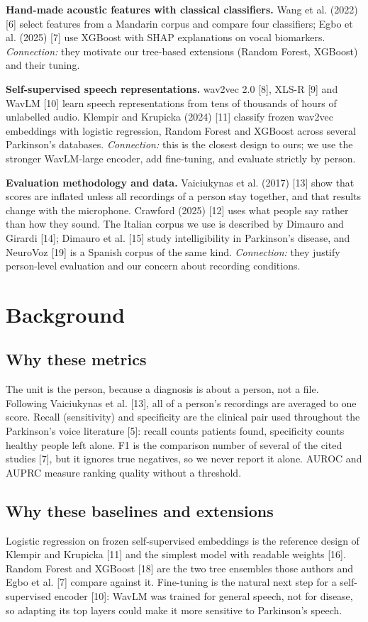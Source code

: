 \documentclass[11pt,a4paper]{article}
\begin{document}
\textbf{Hand-made acoustic features with classical classifiers.} Wang et al. (2022) [6] select features from a Mandarin corpus and compare four classifiers; Egbo et al. (2025) [7] use XGBoost with SHAP explanations on vocal biomarkers. \emph{Connection:} they motivate our tree-based extensions (Random Forest, XGBoost) and their tuning.

\textbf{Self-supervised speech representations.} wav2vec 2.0 [8], XLS-R [9] and WavLM [10] learn speech representations from tens of thousands of hours of unlabelled audio. Klempir and Krupicka (2024) [11] classify frozen wav2vec embeddings with logistic regression, Random Forest and XGBoost across several Parkinson's databases. \emph{Connection:} this is the closest design to ours; we use the stronger WavLM-large encoder, add fine-tuning, and evaluate strictly by person.

\textbf{Evaluation methodology and data.} Vaiciukynas et al. (2017) [13] show that scores are inflated unless all recordings of a person stay together, and that results change with the microphone. Crawford (2025) [12] uses what people say rather than how they sound. The Italian corpus we use is described by Dimauro and Girardi [14]; Dimauro et al. [15] study intelligibility in Parkinson's disease, and NeuroVoz [19] is a Spanish corpus of the same kind. \emph{Connection:} they justify person-level evaluation and our concern about recording conditions.

\section{Background}\label{sec:background}
\subsection{Why these metrics}
The unit is the person, because a diagnosis is about a person, not a file. Following Vaiciukynas et al. [13], all of a person's recordings are averaged to one score. Recall (sensitivity) and specificity are the clinical pair used throughout the Parkinson's voice literature [5]: recall counts patients found, specificity counts healthy people left alone. F1 is the comparison number of several of the cited studies [7], but it ignores true negatives, so we never report it alone. AUROC and AUPRC measure ranking quality without a threshold.

\subsection{Why these baselines and extensions}
Logistic regression on frozen self-supervised embeddings is the reference design of Klempir and Krupicka [11] and the simplest model with readable weights [16]. Random Forest and XGBoost [18] are the two tree ensembles those authors and Egbo et al. [7] compare against it. Fine-tuning is the natural next step for a self-supervised encoder [10]: WavLM was trained for general speech, not for disease, so adapting its top layers could make it more sensitive to Parkinson's speech.
\end{document}
